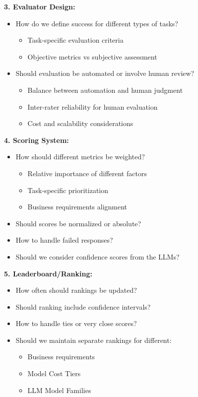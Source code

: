 \textbf{3. Evaluator Design:}
\begin{itemize}
    \item How do we define success for different types of tasks?
    \begin{itemize}
        \item Task-specific evaluation criteria
        \item Objective metrics vs subjective assessment
    \end{itemize}
    \item Should evaluation be automated or involve human review?
    \begin{itemize}
        \item Balance between automation and human judgment
        \item Inter-rater reliability for human evaluation
        \item Cost and scalability considerations
    \end{itemize}
\end{itemize}

\textbf{4. Scoring System:}
\begin{itemize}
    \item How should different metrics be weighted?
    \begin{itemize}
        \item Relative importance of different factors
        \item Task-specific prioritization
        \item Business requirements alignment
    \end{itemize}
    \item Should scores be normalized or absolute?
    \item How to handle failed responses?
    \item Should we consider confidence scores from the LLMs?
\end{itemize}

\textbf{5. Leaderboard/Ranking:}
\begin{itemize}
    \item How often should rankings be updated?
    \item Should ranking include confidence intervals?
    \item How to handle ties or very close scores?
    \item Should we maintain separate rankings for different:
    \begin{itemize}
        \item Business requirements
        \item Model Cost Tiers
        \item LLM Model Families
    \end{itemize}
\end{itemize}

